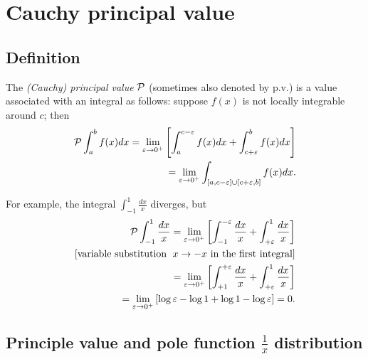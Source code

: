 
\section{Cauchy principal value}

\subsection{Definition}


The {\em  (Cauchy) principal value} ${\cal P}$ (sometimes also denoted by $\textrm{p.v.}$)
is a value associated with an integral as follows:
suppose $f(x)$ is not locally integrable around $c$; then
\begin{equation}
\begin{split}
{\cal P}
\int_{a}^b f(x) dx
= \lim_{\varepsilon \rightarrow 0^+}
\left[
\int_{a}^{c-\varepsilon} f(x) dx
+
\int_{c+\varepsilon}^{b} f(x) dx
\right]
\\
=  \lim_{\varepsilon \rightarrow 0^+}
\int_{[a,c-\varepsilon] \cup [c+\varepsilon,b]}   f(x) dx
.
\end{split}
\end{equation}


{
\color{blue}
\bexample
For example, the integral
$ \int_{-1}^1 \frac{dx}{x}$ diverges, but
\begin{equation}
\begin{split}
{\cal P}
\int_{-1}^1 \frac{dx}{x}
= \lim_{\varepsilon \rightarrow 0^+}
\left[
\int_{-1}^{ -\varepsilon}\frac{dx}{x}
+
\int_{ +\varepsilon}^{1} \frac{dx}{x}
\right]
\\
[\textrm{variable substitution }\; x\rightarrow -x \textrm{ in the first integral}]
\\
=
\lim_{\varepsilon \rightarrow 0^+}
\left[
\int_{+1}^{ +\varepsilon}\frac{dx}{x}
+
\int_{ +\varepsilon}^{1} \frac{dx}{x}
\right]
\\
=
\lim_{\varepsilon \rightarrow 0^+}
\left[
\log \varepsilon - \log 1  + \log 1  - \log \varepsilon
\right]
=0.
\end{split}
\end{equation}
\eexample
}

\subsection{Principle value and pole function $\frac{1}{x}$ distribution}

